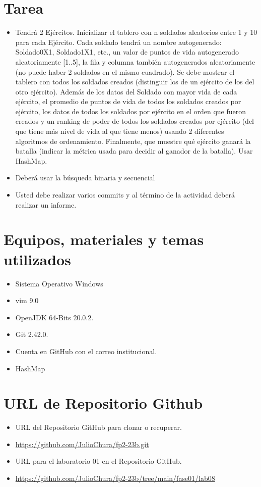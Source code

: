 \documentclass{article}
\begin{document}
	\section{Tarea}
	\begin{itemize}		
		\item 
		Tendrá 2 Ejércitos. Inicializar el tablero con n soldados aleatorios entre 1 y 10 para cada 
		Ejército. Cada soldado tendrá un nombre autogenerado: Soldado0X1, Soldado1X1, etc., un 
		valor de puntos de vida autogenerado aleatoriamente [1..5], la fila y columna también 
		autogenerados aleatoriamente (no puede haber 2 soldados en el mismo cuadrado). Se debe 
		mostrar el tablero con todos los soldados creados (distinguir los de un ejército de los del otro 
		ejército). Además de los datos del Soldado con mayor vida de cada ejército, el promedio de 
		puntos de vida de todos los soldados creados por ejército, los datos de todos los soldados por 
		ejército en el orden que fueron creados y un ranking de poder de todos los soldados creados
		por ejército (del que tiene más nivel de vida al que tiene menos) usando 2 diferentes 
		algoritmos de ordenamiento. Finalmente, que muestre qué ejército ganará la batalla (indicar 
		la métrica usada para decidir al ganador de la batalla). Usar HashMap.
		\item Deberá usar la búsqueda binaria y secuencial
		\item Usted debe realizar varios commits y al término de la actividad deberá realizar un informe.
		
	\end{itemize}
	
	\section{Equipos, materiales y temas utilizados}
	\begin{itemize}
		\item Sistema Operativo Windows
		\item vim 9.0
		\item OpenJDK 64-Bits 20.0.2.
		\item Git 2.42.0.
		\item Cuenta en GitHub con el correo institucional.
		\item HashMap
	\end{itemize}
	
	\section{URL de Repositorio Github}
	\begin{itemize}
		\item URL del Repositorio GitHub para clonar o recuperar.
		\item \url{https://github.com/JulioChura/fp2-23b.git}
		\item URL para el laboratorio 01 en el Repositorio GitHub.
		\item \url{https://github.com/JulioChura/fp2-23b/tree/main/fase01/lab08}
	\end{itemize}
	
\end{document}
